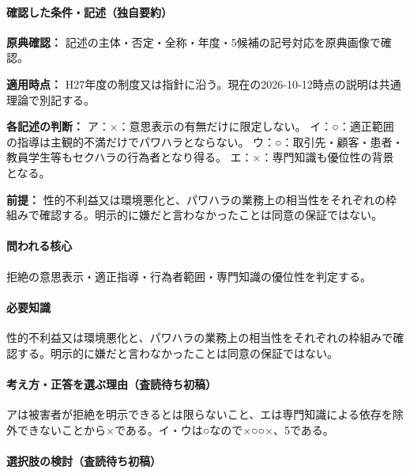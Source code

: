 \paragraph{確認した条件・記述（独自要約）}\mbox{}\par

\noindent\textbf{原典確認：} 記述の主体・否定・全称・年度・5候補の記号対応を原典画像で確認。\par

\noindent\textbf{適用時点：} H27年度の制度又は指針に沿う。現在の2026-10-12時点の説明は共通理論で別記する。\par

\noindent\textbf{各記述の判断：} ア：×：意思表示の有無だけに限定しない。 イ：○：適正範囲の指導は主観的不満だけでパワハラとならない。 ウ：○：取引先・顧客・患者・教員学生等もセクハラの行為者となり得る。 エ：×：専門知識も優位性の背景となる。\par

\noindent\textbf{前提：} 性的不利益又は環境悪化と、パワハラの業務上の相当性をそれぞれの枠組みで確認する。明示的に嫌だと言わなかったことは同意の保証ではない。\par

\paragraph{問われる核心} 拒絶の意思表示・適正指導・行為者範囲・専門知識の優位性を判定する。

\paragraph{必要知識} 性的不利益又は環境悪化と、パワハラの業務上の相当性をそれぞれの枠組みで確認する。明示的に嫌だと言わなかったことは同意の保証ではない。

\paragraph{考え方・正答を選ぶ理由（査読待ち初稿）} アは被害者が拒絶を明示できるとは限らないこと、エは専門知識による依存を除外できないことから×である。イ・ウは○なので×○○×、5である。

\paragraph{選択肢の検討（査読待ち初稿）}\mbox{}\par

